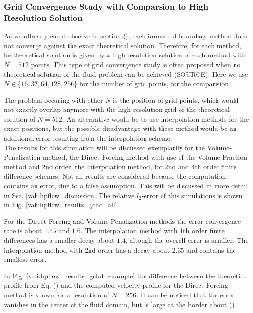 \subsubsection{Grid Convergence Study with Comparsion to High Resolution Solution}


As we allready could observe in section (), each immersed boundary method does not converge against the exact theoretical solution.
Therefore, for each method, he theoretical solution is given by a
high resolution solution of each method with $N=512$ points.
This type of grid convergence study is often proposed
when no theoretical solution of the fluid problem can be achieved (SOURCE).
Here we use $N\in\{16, 32, 64, 128, 256\}$ for the number of grid points, for the comparision.

The problem occuring with other $N$ is the position of grid points, which would not exactly overlap anymore with
the high resolution grid  of the theoretical solution of $N=512$.
An alternative would be to use interpolation methods for the exact positions, but the possible disadvantage with these method
would be an additional error resulting from the interpolation scheme.\\

The results for this simulation will be discussed exemplarily for the Volume-Penalization method, the Direct-Forcing method with
use of the Volume-Fraction method and 2nd order, the Interpolation method, for 2nd and 4th order finite difference schemes.
Not all results are considered  because the computation contains an error, due to a false assumption.
This will be discussed in more detail in Sec. \ref{vali:hpflow_discussion}
The relative $l_2$-error of this simulations is shown in Fig. \ref{vali:hpflow_results_gchd_all}.

For the Direct-Forcing and Volume-Penalization methods the error convergence rate is about  $1.45$ and $1.6$.
The interpolation method with 4th order finite differences has a smaller decay about $1.4$, altough the overall error
is smaller.
The interpolation method with 2nd order has a decay about 2.35 and contains the smallest error.

In Fig. \ref{vali:hpflow_results_gchd_example} the difference between the theoretical profile from Eq. () and
the computed velocity profile for the Direct Forcing method is shown for a resolution of $N=256$.
It can be noticed that the error vanishes in the center of the fluid domain, but is large at the border
about ().



